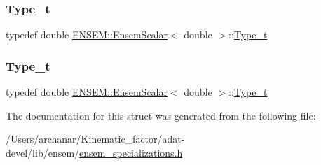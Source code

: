 \subsubsection{\texorpdfstring{Type\_t}{Type\_t}\hspace{0.1cm}{\footnotesize\ttfamily [2/3]}}
{\footnotesize\ttfamily typedef double \mbox{\hyperlink{structENSEM_1_1EnsemScalar}{E\+N\+S\+E\+M\+::\+Ensem\+Scalar}}$<$ double $>$\+::\mbox{\hyperlink{structENSEM_1_1EnsemScalar_3_01double_01_4_a4f1860ca5dda43a72f79631b986d414e}{Type\+\_\+t}}}

\mbox{\label{structENSEM_1_1EnsemScalar_3_01double_01_4_a4f1860ca5dda43a72f79631b986d414e}} 
\subsubsection{\texorpdfstring{Type\_t}{Type\_t}\hspace{0.1cm}{\footnotesize\ttfamily [3/3]}}
{\footnotesize\ttfamily typedef double \mbox{\hyperlink{structENSEM_1_1EnsemScalar}{E\+N\+S\+E\+M\+::\+Ensem\+Scalar}}$<$ double $>$\+::\mbox{\hyperlink{structENSEM_1_1EnsemScalar_3_01double_01_4_a4f1860ca5dda43a72f79631b986d414e}{Type\+\_\+t}}}



The documentation for this struct was generated from the following file\+:\begin{DoxyCompactItemize}
\item 
/\+Users/archanar/\+Kinematic\+\_\+factor/adat-\/devel/lib/ensem/\mbox{\hyperlink{adat-devel_2lib_2ensem_2ensem__specializations_8h}{ensem\+\_\+specializations.\+h}}\end{DoxyCompactItemize}
